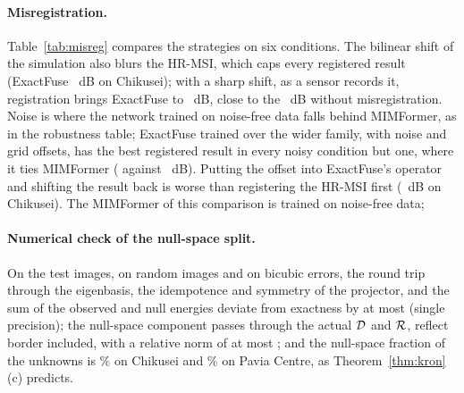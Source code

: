 \documentclass[journal]{IEEEtran}
\begin{document}
\paragraph{Misregistration.} Table~\ref{tab:misreg} compares the strategies on six conditions. The bilinear shift of the simulation also blurs the HR-MSI, which caps every registered result (ExactFuse ~dB on Chikusei); with a sharp shift, as a sensor records it, registration brings ExactFuse to ~dB, close to the ~dB without misregistration. Noise is where the network trained on noise-free data falls behind MIMFormer, as in the robustness table; ExactFuse trained over the wider family, with noise and grid offsets, has the best registered result in every noisy condition but one, where it ties MIMFormer ( against ~dB). Putting the offset into ExactFuse's operator and shifting the result back is worse than registering the HR-MSI first (~dB on Chikusei). The MIMFormer of this comparison is trained on noise-free data; 

\paragraph{Numerical check of the null-space split.} On the test images, on random images and on bicubic errors, the round trip through the eigenbasis, the idempotence and symmetry of the projector, and the sum of the observed and null energies deviate from exactness by at most  (single precision); the null-space component passes through the actual $\mathcal{D}$ and $\mathcal{R}$, reflect border included, with a relative norm of at most ; and the null-space fraction of the unknowns is \% on Chikusei and \% on Pavia Centre, as Theorem~\ref{thm:kron}(c) predicts.
\end{document}

